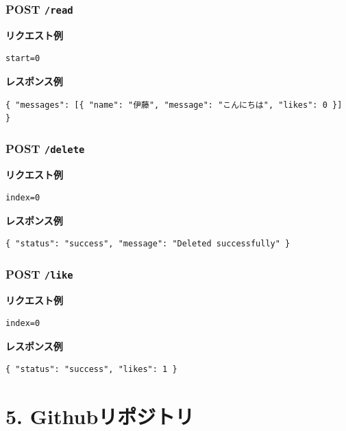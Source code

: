 \documentclass[uplatex,dvipdfmx]{jsarticle}
\begin{document}
\subsubsection*{POST \texttt{/read}}
\textbf{リクエスト例}
\begin{verbatim}
start=0
\end{verbatim}
\textbf{レスポンス例}
\begin{verbatim}
{ "messages": [{ "name": "伊藤", "message": "こんにちは", "likes": 0 }] }
\end{verbatim}

\subsubsection*{POST \texttt{/delete}}
\textbf{リクエスト例}
\begin{verbatim}
index=0
\end{verbatim}
\textbf{レスポンス例}
\begin{verbatim}
{ "status": "success", "message": "Deleted successfully" }
\end{verbatim}

\subsubsection*{POST \texttt{/like}}
\textbf{リクエスト例}
\begin{verbatim}
index=0
\end{verbatim}
\textbf{レスポンス例}
\begin{verbatim}
{ "status": "success", "likes": 1 }
\end{verbatim}
\section*{5. Githubリポジトリ}
\end{document}
